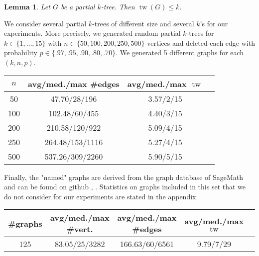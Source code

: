 \documentclass[11pt,a4paper]{article}
\newtheorem*{lemma}{Lemma}
\DeclareMathOperator{\tw}{tw}
\begin{document}
\begin{lemma}
Let $G$ be a partial $k$-tree. Then $\tw(G) \leq k$.
\end{lemma}

We consider several partial $k$-trees of different size and several $k$'s for our experiments. More precisely, we generated random partial $k$-trees for $k \in \{1, \dots, 15\}$ with $n \in \{50,100,200,250,500\}$ vertices and deleted each edge with probability $p \in \{.97, .95, .90, .80, .70\}$. We generated 5 different graphs for each $(k, n, p)$.

\begin{table}[h!]
\begin{tabular}{|c|c|c|c|}
\hline
$n$ & avg/med./max \#edges & avg/med./max $\tw$ \\
\hline \hline
50 & 47.70/28/196 & 3.57/2/15 \\
\hline
100 & 102.48/60/455 & 4.40/3/15 \\
\hline
200 & 210.58/120/922 & 5.09/4/15 \\
\hline
250 & 264.48/153/1116 & 5.27/4/15 \\
\hline
500 & 537.26/309/2260 & 5.90/5/15 \\
\hline
\end{tabular}
\end{table}

Finally, the "named" graphs are derived from the graph database of SageMath and can be found on github \cite{sage}, \cite{named_graphs}. Statistics on graphs included in this set that we do not consider for our experiments are stated in the appendix. \\

\begin{table}[h!]
\begin{tabular}{|c|c|c|c|c|}
\hline
\#graphs & avg/med./max \#vert. & avg/med./max \#edges & avg/med./max $\tw$ \\
\hline \hline
125 & 83.05/25/3282 & 166.63/60/6561 & 9.79/7/29 \\
\hline
\end{tabular}
\end{table}


\end{document}
